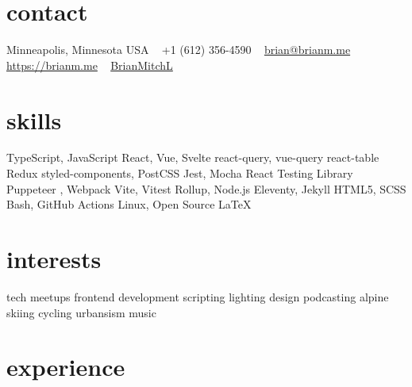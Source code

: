 \documentclass[]{cv-style} %
\begin{document}
\lastupdated


\begin{aside} %
\section{contact}
\small{Minneapolis, Minnesota USA}
~
+1 (612) 356-4590
~
\href{mailto:bman4789@gmail.com}{brian@brianm.me}
~
\href{https://brianm.me}{https://brianm.me}
~
\href{https://github.com/BrianMitchL}{\textcolor{headercolor}{ }BrianMitchL}
\section{skills}
TypeScript, JavaScript
React, Vue, Svelte
react-query, vue-query
react-table
Redux
styled-components,
PostCSS
Jest, Mocha
React Testing Library
Puppeteer
, Webpack
Vite, Vitest
Rollup, Node.js
Eleventy, Jekyll
HTML5, SCSS
Bash, GitHub Actions
Linux, Open Source
\LaTeX
\section{interests}
tech meetups
frontend development
scripting
lighting design
podcasting
alpine skiing
cycling
urbansism
music
\end{aside}



\section{experience}

%
%
%
%
\end{document}

